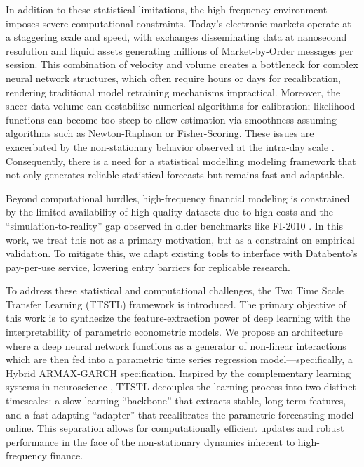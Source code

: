 \documentclass[10pt,a4paper,oneside]{article}
\providecommand{\DIFaddtex}[1]{{\protect\color{blue} \sf #1}} %
\providecommand{\DIFdeltex}[1]{{\protect\color{red} \scriptsize #1}} %
\providecommand{\DIFaddbegin}{} %
\providecommand{\DIFaddend}{} %
\providecommand{\DIFdelbegin}{} %
\providecommand{\DIFdelend}{} %
\providecommand{\DIFadd}[1]{\texorpdfstring{\DIFaddtex{#1}}{#1}} %
\providecommand{\DIFdel}[1]{\texorpdfstring{\DIFdeltex{#1}}{}} %
\newcommand{\DIFscaledelfig}{0.5}
\newlength{\DIFdelgraphicswidth} %
\newlength{\DIFdelgraphicsheight} %
\newcommand{\DIFaddincludegraphics}[2][]{{\color{blue}\fbox{\DIFOincludegraphics[#1]{#2}}}} %
\newcommand{\DIFdelincludegraphics}[2][]{%
\sbox{\DIFdelgraphicsbox}{\DIFOincludegraphics[#1]{#2}}%
\settoboxwidth{\DIFdelgraphicswidth}{\DIFdelgraphicsbox} %
\settoboxtotalheight{\DIFdelgraphicsheight}{\DIFdelgraphicsbox} %
\scalebox{\DIFscaledelfig}{%
\parbox[b]{\DIFdelgraphicswidth}{\usebox{\DIFdelgraphicsbox}\\[-\baselineskip] \rule{\DIFdelgraphicswidth}{0em}}\llap{\resizebox{\DIFdelgraphicswidth}{\DIFdelgraphicsheight}{%
\setlength{\unitlength}{\DIFdelgraphicswidth}%
\begin{picture}(1,1)%
\thicklines\linethickness{2pt} %
{\color[rgb]{1,0,0}\put(0,0){\framebox(1,1){}}}%
{\color[rgb]{1,0,0}\put(0,0){\line( 1,1){1}}}%
{\color[rgb]{1,0,0}\put(0,1){\line(1,-1){1}}}%
\end{picture}%
}\hspace*{3pt}}} %
} %
\DeclareRobustCommand{\DIFaddbegin}{\DIFOaddbegin \let\includegraphics\DIFaddincludegraphics} %
\DeclareRobustCommand{\DIFaddend}{\DIFOaddend \let\includegraphics\DIFOincludegraphics} %
\DeclareRobustCommand{\DIFdelbegin}{\DIFOdelbegin \let\includegraphics\DIFdelincludegraphics} %
\DeclareRobustCommand{\DIFdelend}{\DIFOaddend \let\includegraphics\DIFOincludegraphics} %
\begin{document}
In addition to these statistical limitations, the high-frequency environment imposes severe computational constraints. Today's electronic markets operate at a staggering scale and speed, with exchanges disseminating data at nanosecond resolution and liquid assets generating millions of Market-by-Order messages per session. This combination of velocity and volume creates a bottleneck for complex neural network structures, which often require hours or days for recalibration, rendering traditional model retraining mechanisms impractical. Moreover, the sheer data volume can destabilize numerical algorithms for calibration; likelihood functions can become too steep to allow estimation via smoothness-assuming algorithms such as Newton-Raphson or Fisher-Scoring. These issues are exacerbated by the non-stationary behavior observed at the intra-day scale \cite{dutta2023review, Vyetrenko2019GetRR}. Consequently, there is a need for a statistical \DIFdelbegin \DIFdel{modelling }\DIFdelend \DIFaddbegin \DIFadd{modeling }\DIFaddend framework that not only generates reliable statistical forecasts but remains fast and adaptable.

Beyond computational hurdles, high-frequency financial modeling is constrained by the limited availability of high-quality datasets due to high costs \cite{KISSELL201447} and the ``simulation-to-reality'' gap observed in older benchmarks like FI-2010 \cite{prata2024lob}. In this work, we treat this not as a primary motivation, but as a constraint on empirical validation. To mitigate this, we adapt existing tools to interface with Databento's pay-per-use service, lowering entry barriers for replicable research.

To address these statistical and computational challenges, the Two Time Scale Transfer Learning (TTSTL) framework is introduced. The primary objective of this work is to synthesize the feature-extraction power of deep learning with the interpretability of parametric econometric models. We propose an architecture where a deep neural network functions as a generator of non-linear interactions which are then fed into a parametric time series regression model—specifically, a Hybrid ARMAX-GARCH specification. Inspired by the complementary learning systems in neuroscience \cite{pham_continual_2024}, TTSTL decouples the learning process into two distinct timescales: a slow-learning ``backbone'' that extracts stable, long-term features, and a fast-adapting ``adapter'' that recalibrates the parametric forecasting model online. This separation allows for computationally efficient updates and robust performance in the face of the non-stationary dynamics inherent to high-frequency finance.
\end{document}
